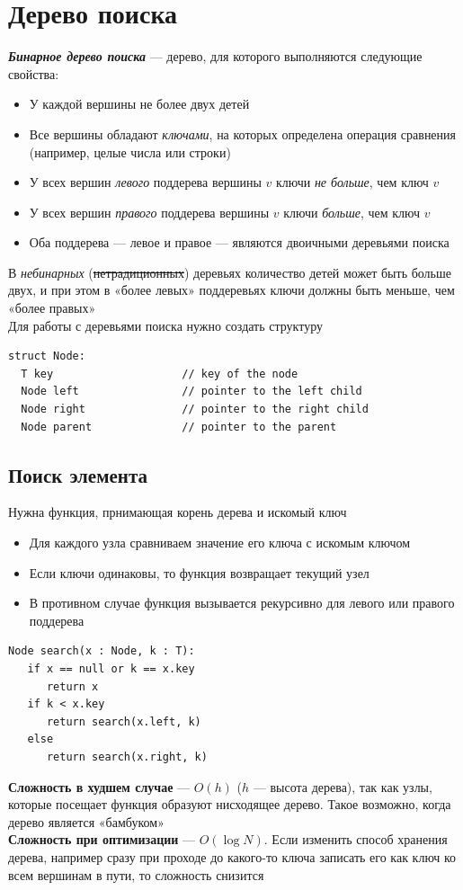 \documentclass[a4paper]{article}
\begin{document}
\section{Дерево поиска}
\textbf{\textit{Бинарное дерево поиска}} — дерево, для которого выполняются следующие свойства:
\begin{itemize}
\item У каждой вершины не более двух детей
\item Все вершины обладают \textit{ключами}, на которых определена операция сравнения (например, целые числа или строки)
\item У всех вершин \textit{левого} поддерева вершины $v$ ключи \textit{не больше}, чем ключ $v$
\item У всех вершин \textit{правого} поддерева вершины $v$ ключи \textit{больше}, чем ключ $v$
\item Оба поддерева — левое и правое — являются двоичными деревьями поиска
\end{itemize}
В \textit{небинарных} (\sout{нетрадиционных}) деревьях количество детей может быть больше двух, и при этом в «более левых» поддеревьях ключи должны быть меньше, чем «более правых»\\[2mm]
\indent Для работы с деревьями поиска нужно создать структуру
\begin{lstlisting}
struct Node:
  T key                    // key of the node
  Node left                // pointer to the left child
  Node right               // pointer to the right child
  Node parent              // pointer to the parent
\end{lstlisting}
\subsection{Поиск элемента}
Нужна функция, прнимающая корень дерева и искомый ключ
\begin{itemize}
    \item Для каждого узла сравниваем значение его ключа с искомым ключом
    \item Если ключи одинаковы, то функция возвращает текущий узел
    \item В противном случае функция вызывается рекурсивно для левого или правого поддерева
\end{itemize}
\begin{lstlisting}
Node search(x : Node, k : T):
   if x == null or k == x.key
      return x
   if k < x.key
      return search(x.left, k)
   else
      return search(x.right, k)
\end{lstlisting}
\textbf{Сложность в худшем случае} — $O(h)$ ($h$ — высота дерева), так как узлы, которые посещает функция образуют нисходящее дерево. Такое возможно, когда дерево является «бамбуком»\\[2mm]
\textbf{Сложность при оптимизации} — $O(\log N)$. Если изменить способ хранения дерева, например сразу при проходе до какого-то ключа записать его как ключ ко всем вершинам в пути, то сложность снизится
\end{document}
